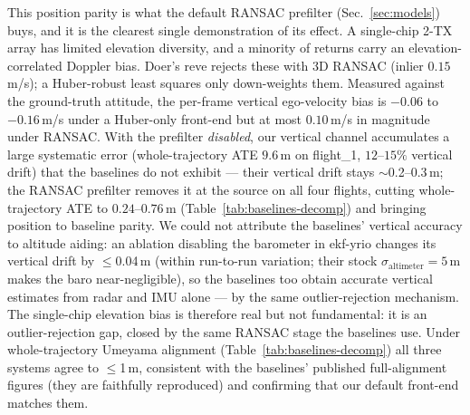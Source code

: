 \documentclass[conference]{IEEEtran}
\begin{document}
This position parity is what the default RANSAC prefilter
(Sec.~\ref{sec:models}) buys, and it is the clearest single
demonstration of its effect.  A single-chip 2-TX array has limited
elevation diversity, and a minority of returns carry an
elevation-correlated Doppler bias.  Doer's \mbox{reve} rejects these
with 3D RANSAC (inlier $0.15$\,m/s); a Huber-robust least squares only
down-weights them.  Measured against the ground-truth attitude, the
per-frame vertical ego-velocity bias is $-0.06$ to $-0.16$\,m/s under a
Huber-only front-end but at most $0.10$\,m/s in magnitude under RANSAC.
With the prefilter \emph{disabled}, our vertical channel accumulates a
large systematic error (whole-trajectory ATE $9.6$\,m on flight\_1,
$12$--$15\%$ vertical drift) that the baselines do not exhibit --- their
vertical drift stays $\sim$0.2--0.3\,m; the RANSAC prefilter removes it
at the source on all four flights, cutting whole-trajectory ATE to
$0.24$--$0.76$\,m (Table~\ref{tab:baselines-decomp}) and bringing
position to baseline parity.  We could not attribute the baselines'
vertical accuracy to altitude aiding: an ablation disabling the
barometer in ekf-yrio changes its vertical drift by $\le$0.04\,m (within
run-to-run variation; their stock $\sigma_\mathrm{altimeter}{=}5$\,m
makes the baro near-negligible), so the baselines too obtain accurate
vertical estimates from radar and IMU alone --- by the same
outlier-rejection mechanism.  The single-chip elevation bias is
therefore real but not fundamental: it is an outlier-rejection gap,
closed by the same RANSAC stage the baselines use.  Under
whole-trajectory Umeyama alignment (Table~\ref{tab:baselines-decomp})
all three systems agree to $\le$1\,m, consistent with the baselines'
published full-alignment figures (they are faithfully reproduced) and
confirming that our default front-end matches them.
\end{document}
